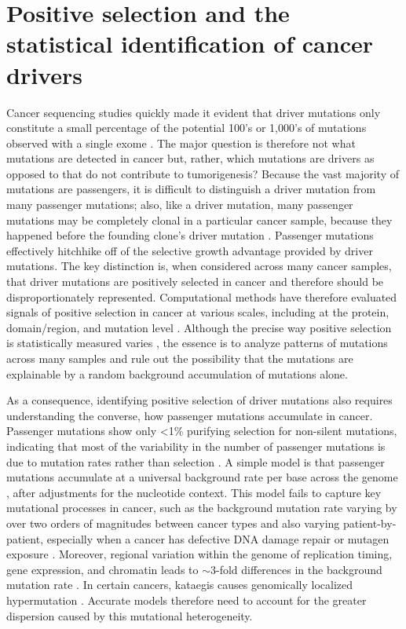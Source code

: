 \section{Positive selection and the statistical identification of cancer drivers}
\label{sec:section}

Cancer sequencing studies quickly made it evident that driver mutations only constitute a small percentage of the potential 100's or 1,000's of mutations observed with a single exome \cite{RN25}. The major question is therefore not what mutations are detected in cancer but, rather, which mutations are drivers as opposed to  that do not contribute to tumorigenesis? Because the vast majority of mutations are passengers, it is difficult to distinguish a driver mutation from many passenger mutations; also, like a driver mutation, many passenger mutations may be completely clonal in a particular cancer sample, because they happened before the founding clone's driver mutation \cite{RN160, RN50}. Passenger mutations effectively hitchhike off of the selective growth advantage provided by driver mutations. The key distinction is, when considered across many cancer samples, that driver mutations are positively selected in cancer and therefore should be disproportionately represented. Computational methods have therefore evaluated signals of positive selection in cancer at various scales, including at the protein, domain/region, and mutation level \cite{RN52}. Although the precise way positive selection is statistically measured varies \cite{RN49}, the essence is to analyze patterns of mutations across many samples and rule out the possibility that the mutations are explainable by a random background accumulation of mutations alone. 

As a consequence, identifying positive selection of driver mutations also requires understanding the converse, how passenger mutations accumulate in cancer. Passenger mutations show only \textless1\% purifying selection for non-silent mutations, indicating that most of the variability in the number of passenger mutations is due to mutation rates rather than selection \cite{RN56}. A simple model is that passenger mutations accumulate at a universal background rate per base across the genome \cite{RN3}, after adjustments for the nucleotide context. This model fails to capture key mutational processes in cancer, such as the background mutation rate varying by over two orders of magnitudes between cancer types \cite{RN13} and also varying patient-by-patient, especially when a cancer has defective DNA damage repair or mutagen exposure \cite{RN51}. Moreover, regional variation within the genome of replication timing, gene expression, and chromatin leads to $\sim$3-fold differences in the background mutation rate \cite{RN13}. In certain cancers, kataegis causes genomically localized hypermutation \cite{RN164}. Accurate models therefore need to account for the greater dispersion caused by this mutational heterogeneity.

